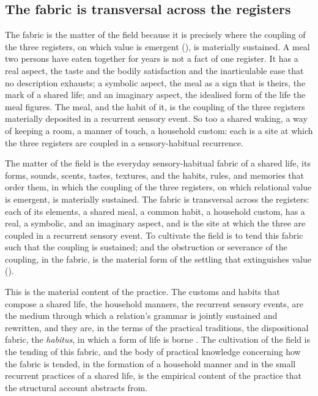 \subsection{The fabric is transversal across the registers}
\label{p10:sec:fm-transversal}

The fabric is the matter of the field because it is precisely where the coupling of the three registers, on which value is emergent (), is materially sustained. A meal two persons have eaten together for years is not a fact of one register. It has a real aspect, the taste and the bodily satisfaction and the inarticulable ease that no description exhausts; a symbolic aspect, the meal as a sign that is theirs, the mark of a shared life; and an imaginary aspect, the idealised form of the life the meal figures. The meal, and the habit of it, is the coupling of the three registers materially deposited in a recurrent sensory event. So too a shared waking, a way of keeping a room, a manner of touch, a household custom: each is a site at which the three registers are coupled in a sensory-habitual recurrence.

\begin{claim}
The matter of the field is the everyday sensory-habitual fabric of a shared life, its forms, sounds, scents, tastes, textures, and the habits, rules, and memories that order them, in which the coupling of the three registers, on which relational value is emergent, is materially sustained. The fabric is transversal across the registers: each of its elements, a shared meal, a common habit, a household custom, has a real, a symbolic, and an imaginary aspect, and is the site at which the three are coupled in a recurrent sensory event. To cultivate the field is to tend this fabric such that the coupling is sustained; and the obstruction or severance of the coupling, in the fabric, is the material form of the settling that extinguishes value ().
\end{claim}

\noindent
This is the material content of the practice. The customs and habits that compose a shared life, the household manners, the recurrent sensory events, are the medium through which a relation's grammar is jointly sustained and rewritten, and they are, in the terms of the practical traditions, the dispositional fabric, the \emph{habitus}, in which a form of life is borne \parencite{bourdieu1990}. The cultivation of the field is the tending of this fabric, and the body of practical knowledge concerning how the fabric is tended, in the formation of a household manner and in the small recurrent practices of a shared life, is the empirical content of the practice that the structural account abstracts from.

